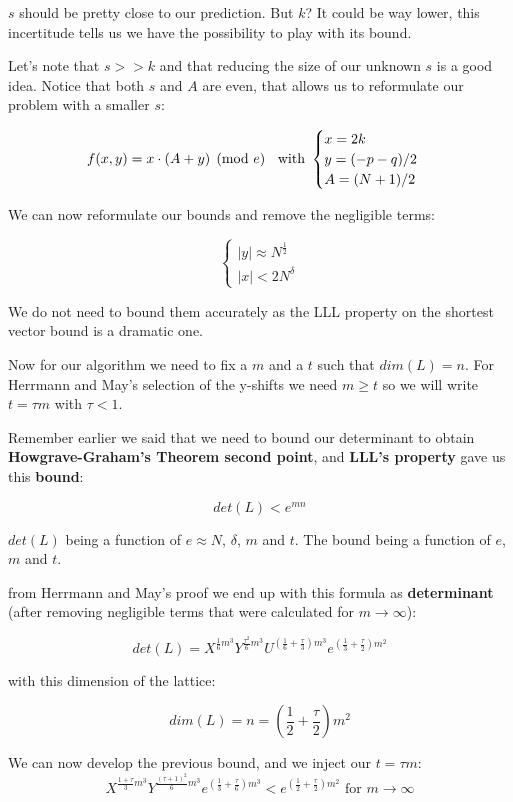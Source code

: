 \documentclass[a4paper,11pt]{article}
\begin{document}
$s$ should be pretty close to our prediction. But $k$? It could be way lower, this incertitude tells us we have the possibility to play with its bound.

Let's note that $s >> k$ and that reducing the size of our unknown $s$ is a good idea. Notice that both $s$ and $A$ are even, that allows us to reformulate our problem with a smaller $s$:

\[ f(x,y) = x \cdot ( A + y) \pmod{e}  \hspace{2mm} \mbox{ with } \begin{cases} x = 2k \\
 y = (-p-q)/2\\
 A = (N+1)/2
 \end{cases} \]
 
 We can now reformulate our bounds and remove the negligible terms:

\[ \begin{cases} |y| \approx N^{\frac{1}{2}}\\
|x| < 2N^\delta
\end{cases}\]

We do not need to bound them accurately as the LLL property on the shortest vector bound is a dramatic one.

Now for our algorithm we need to fix a $m$ and a $t$ such that $dim(L) = n$. For Herrmann and May's selection of the y-shifts we need $m \geq t$ so we will write $t = \tau m$ with $\tau < 1$.

Remember earlier we said that we need to bound our determinant to obtain \textbf{Howgrave-Graham's Theorem second point}, and \textbf{LLL's property} gave us this \textbf{bound}:

\[ det(L) < e^{mn} \]

$det(L)$ being a function of $e \approx N$, $\delta$, $m$ and $t$. The bound being a function of $e$, $m$ and $t$.

from Herrmann and May's proof we end up with this formula as \textbf{determinant} (after removing negligible terms that were calculated for $m \rightarrow \infty$):

\[ det(L) = X^{\frac{1}{6}m^3} Y^{\frac{\tau^2}{6}m^3} U^{(\frac{1}{6} + \frac{\tau}{3})m^3} e^{(\frac{1}{3} + \frac{\tau}{2})m^2} \]

with this dimension of the lattice:

\[ dim(L) = n = \left(\frac{1}{2} + \frac{\tau}{2}\right)m^2 \]

We can now develop the previous bound, and we inject our $t = \tau m$:
\[ X^{\frac{1+\tau}{3}m^3}Y^{\frac{(\tau +1)^2}{6}m^3} e^{(\frac{1}{3} + \frac{\tau}{6})m^3} < e^{(\frac{1}{2} + \frac{\tau}{2})m^2} \text{ for } m \rightarrow \infty \]
\end{document}
